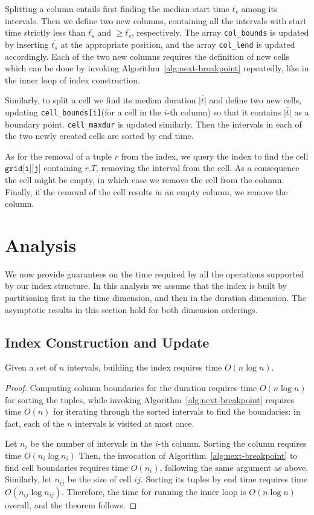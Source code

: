 \documentclass[sigconf,nonacm,anonymous]{acmart}
\theoremstyle{definition}
\newcommand{\BO}[1]{O\left(#1\right)}
\newcommand{\T}{\ensuremath{t}} %
\newcommand{\TS}{\ensuremath{t_s}}
\newcommand{\rT}{\ensuremath{r.T}}
\newcommand{\Colbounds}{\texttt{col\_bounds}\xspace}
\newcommand{\Cellboundsi}{\texttt{cell\_bounds[i]}\xspace}
\newcommand{\Gridij}{\texttt{grid[i][j]}\xspace}
\newcommand{\LatestEnds}{\texttt{col\_lend}\xspace}
\newcommand{\MaxDurations}{\texttt{cell\_maxdur}\xspace}
\begin{document}
Splitting a column entails first finding the median start time $\bar{\TS}$
among its intervals.
Then we define two new columns, containing all the intervals with start time
strictly less than $\bar{\TS}$ and $\ge \bar{\TS}$, respectively.
The array \Colbounds is updated by inserting $\bar{\TS}$ at the appropriate
position, and the array \LatestEnds is updated accordingly.
Each of the two new columns requires the definition of new cells
which can be done by invoking
Algorithm~\ref{alg:next-breakpoint} repeatedly, like in the inner loop of
index construction.

Similarly, to split a cell we find its median duration $\bar{|\T|}$ and define
two new cells, updating \Cellboundsi (for a cell in the $i$-th column)
so that it contains $\bar{|\T|}$ as a boundary point.
\MaxDurations is updated similarly.
Then the intervals in each of
the two newly created cells are sorted by end time.

As for the removal of a tuple $r$ from the index, we query the index to find
the cell $\Gridij$ containing $\rT$, removing the interval from the cell. As a
consequence the cell might be empty, in which case we remove the cell
from the column. Finally, if the removal of the cell results in an empty
column, we remove the column.

\section{Analysis}

We now provide guarantees on the time required by all the operations
supported by our index structure. In this analysis we assume that the index
is built by partitioning first in the time dimension, and then in the
duration dimension.
The asymptotic results in this
section hold for both dimension orderings.

\subsection{Index Construction and Update}

\begin{theorem}
	Given a set of $n$ intervals, building the index requires time $\BO{n \log n}$.
\end{theorem}
\begin{proof}
  Computing column boundaries for the duration requires
  time $\BO{n\log n}$ for sorting the tuples, while invoking
  Algorithm~\ref{alg:next-breakpoint} requires time 
  $\BO{n}$ for iterating through the sorted intervals to find the boundaries: in fact, each of the $n$ intervals is
  visited at most once.

	Let $n_i$ be the number of intervals in the $i$-th column.
	Sorting the column requires time $\BO{n_i\log n_i}$
	Then, the invocation of Algorithm~\ref{alg:next-breakpoint} to find cell boundaries
	requires time $\BO{n_i}$, following the same argument as above.
	Similarly, let $n_{ij}$ be the size of cell $ij$. Sorting its tuples by end time requires time $\BO{n_{ij} \log n_{ij}}$.
	Therefore, the time for running the inner loop is
	$\BO{n \log n}$ overall,
	and the theorem follows.
\end{proof}
\end{document}
